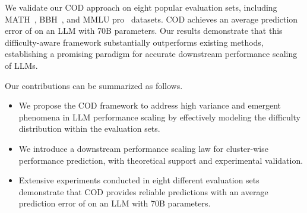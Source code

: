 

We validate our COD approach on eight popular evaluation sets, including MATH~\citep{hendrycks2021measuring}, BBH~\citep{suzgun2023challenging}, and MMLU pro~\citep{wang2024mmlu} datasets. COD achieves an average prediction error of  on an LLM with 70B parameters. Our results demonstrate that this difficulty-aware framework substantially outperforms existing methods, establishing a promising paradigm for accurate downstream performance scaling of LLMs.

Our contributions can be summarized as follows.
\vspace{-5pt}

\begin{itemize}[leftmargin=1.5em]
\item We propose the COD framework to address high variance and emergent phenomena in LLM performance scaling by effectively modeling the difficulty distribution within the evaluation sets.
\item We introduce a downstream performance scaling law for cluster-wise performance prediction, with theoretical support and experimental validation.
\item Extensive experiments conducted in eight different evaluation sets demonstrate that COD provides reliable predictions with an average prediction error of  on an LLM with 70B parameters.
\end{itemize}
\vspace{-5pt}


